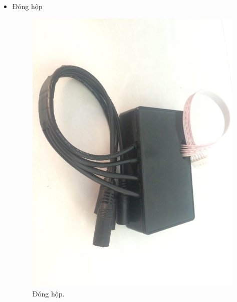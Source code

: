 \documentclass[a4paper,12pt,oneside]{article}
\begin{document}
\begin{itemize}
\item Đóng hộp
	\begin{figure}[H]
	\begin{center}
	\includegraphics[scale=.15]{hinh/relay_box.jpg}
	\end{center}
	\caption{Đóng hộp.}
	\end{figure}
\end{itemize}
\end{document}
